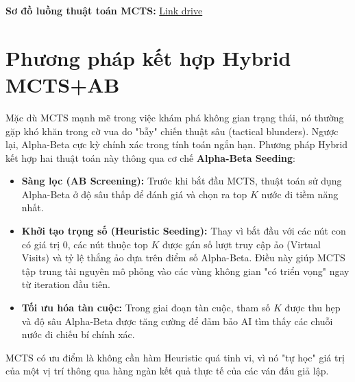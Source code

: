 \textbf{Sơ đồ luồng thuật toán MCTS: } \href{https://drive.google.com/file/d/1dWdhr5YxImuhE4qjHy9S6u2ekVSK3WdT/view?usp=sharing}{Link drive}


\section{Phương pháp kết hợp Hybrid MCTS+AB}

Mặc dù MCTS mạnh mẽ trong việc khám phá không gian trạng thái, nó thường gặp khó khăn trong cờ vua do "bẫy" chiến thuật sâu (tactical blunders). Ngược lại, Alpha-Beta cực kỳ chính xác trong tính toán ngắn hạn. Phương pháp Hybrid kết hợp hai thuật toán này thông qua cơ chế \textbf{Alpha-Beta Seeding}:

\begin{itemize}
    \item \textbf{Sàng lọc (AB Screening):} Trước khi bắt đầu MCTS, thuật toán sử dụng Alpha-Beta ở độ sâu thấp để đánh giá và chọn ra top $K$ nước đi tiềm năng nhất.
    \item \textbf{Khởi tạo trọng số (Heuristic Seeding):} Thay vì bắt đầu với các nút con có giá trị 0, các nút thuộc top $K$ được gán số lượt truy cập ảo (Virtual Visits) và tỷ lệ thắng ảo dựa trên điểm số Alpha-Beta. Điều này giúp MCTS tập trung tài nguyên mô phỏng vào các vùng không gian "có triển vọng" ngay từ iteration đầu tiên.
    \item \textbf{Tối ưu hóa tàn cuộc:} Trong giai đoạn tàn cuộc, tham số $K$ được thu hẹp và độ sâu Alpha-Beta được tăng cường để đảm bảo AI tìm thấy các chuỗi nước đi chiếu bí chính xác.
\end{itemize}

MCTS có ưu điểm là không cần hàm Heuristic quá tinh vi, vì nó "tự học" giá trị của một vị trí thông qua hàng ngàn kết quả thực tế của các ván đấu giả lập.
